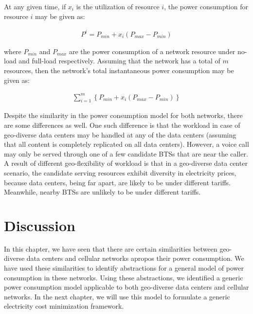 At any given time, if $x_i$ is the utilization of resource $i$, the power consumption for resource $i$ may be given as:

\begin{align}
P^i = P_{min} + x_i (P_{max} - P_{min})
\end{align}

where $P_{min}$ and $P_{max}$ are the power consumption of a network resource under no-load and full-load respectively. Assuming that the network has a total of $m$ resources, then the network's total instantaneous power consumption may be given as:

\begin{align}
\sum_{i=1}^m \left\{ P_{min} + x_i (P_{max} - P_{min}) \right\}
\label{eq:abdcpaper}
\end{align}

Despite the similarity in the power consumption model for both networks, there are some differences as well. One such difference is that the workload in case of geo-diverse data centers may be handled at any of the data centers (assuming that all content is completely replicated on all data centers). However, a voice call may only be served through one of a few candidate BTSs that are near the caller. A result of different geo-flexibility of workload is that in a geo-diverse data center scenario, the candidate serving resources exhibit diversity in electricity prices, because data centers, being far apart, are likely to be under different tariffs. Meanwhile, nearby BTSs are unlikely to be under different tariffs. 

\section{Discussion}
In this chapter, we have seen that there are certain similarities between geo-diverse data centers and cellular networks apropos their power consumption. We have used these similarities to identify abstractions for a general model of power consumption in these networks. Using these abstractions, we identified a generic power consumption model applicable to both geo-diverse data centers and cellular networks. In the next chapter, we will use this model to formulate a generic electricity cost minimization framework.